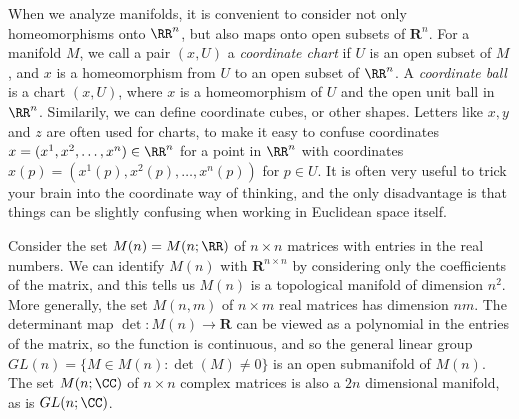 When we analyze manifolds, it is convenient to consider not only homeomorphisms onto $\RR^n$, but also maps onto open subsets of $\mathbf{R}^n$. For a manifold $M$, we call a pair $(x,U)$ a \emph{coordinate chart} if $U$ is an open subset of $M$, and $x$ is a homeomorphism from $U$ to an open subset of $\RR^n$. A \emph{coordinate ball} is a chart $(x,U)$, where $x$ is a homeomorphism of $U$ and the open unit ball in $\RR^n$. Similarily, we can define coordinate cubes, or other shapes. Letters like $x,y$ and $z$ are often used for charts, to make it easy to confuse coordinates $x = (x^1,x^2, \dots, x^n) \in \RR^n$ for a point in $\RR^n$ with coordinates $x(p) = (x^1(p), x^2(p), \dots, x^n(p))$ for $p \in U$. It is often very useful to trick your brain into the coordinate way of thinking, and the only disadvantage is that things can be slightly confusing when working in Euclidean space itself.

\begin{example}
    Consider the set $M(n) = M(n;\RR)$ of $n \times n$ matrices with entries in the real numbers. We can identify $M(n)$ with $\mathbf{R}^{n \times n}$ by considering only the coefficients of the matrix, and this tells us $M(n)$ is a topological manifold of dimension $n^2$. More generally, the set $M(n,m)$ of $n \times m$ real matrices has dimension $nm$. The determinant map $\det: M(n) \to \mathbf{R}$ can be viewed as a polynomial in the entries of the matrix, so the function is continuous, and so the general linear group $GL(n) = \{ M \in M(n) : \det(M) \neq 0 \}$ is an open submanifold of $M(n)$. The set $M(n;\CC)$ of $n \times n$ complex matrices is also a $2n$ dimensional manifold, as is $GL(n;\CC)$.
\end{example}

